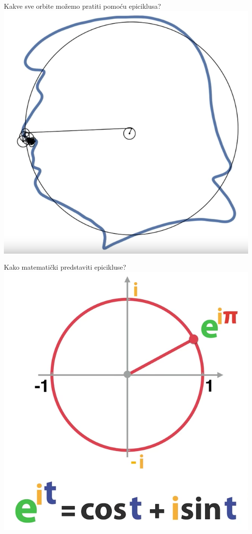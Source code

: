 \documentclass{beamer}
\begin{document}
\begin{frame}{Kakve sve orbite mo\v{z}emo pratiti pomo\'c{}u epiciklusa?}
    \centering
    \includegraphics[scale=0.35]{images/ep1.PNG}
\end{frame}

\begin{frame}{Kako matemati\v{c}ki predstaviti epicikluse?}
    \centering
    \includegraphics[scale=0.35]{images/ep3.PNG}
\end{frame}
\end{document}
